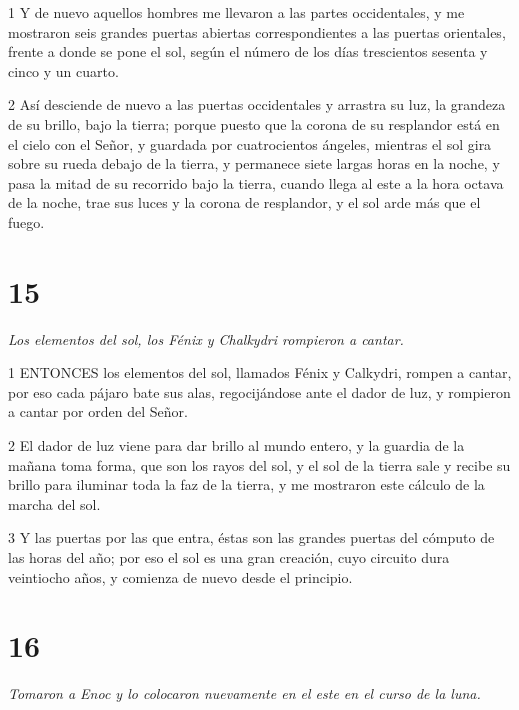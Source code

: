 \par 1 Y de nuevo aquellos hombres me llevaron a las partes occidentales, y me mostraron seis grandes puertas abiertas correspondientes a las puertas orientales, frente a donde se pone el sol, según el número de los días trescientos sesenta y cinco y un cuarto.

\par 2 Así desciende de nuevo a las puertas occidentales y arrastra su luz, la grandeza de su brillo, bajo la tierra; porque puesto que la corona de su resplandor está en el cielo con el Señor, y guardada por cuatrocientos ángeles, mientras el sol gira sobre su rueda debajo de la tierra, y permanece siete largas horas en la noche, y pasa la mitad de su recorrido bajo la tierra, cuando llega al este a la hora octava de la noche, trae sus luces y la corona de resplandor, y el sol arde más que el fuego.

\chapter{15}

\par \textit{Los elementos del sol, los Fénix y Chalkydri rompieron a cantar.}

\par 1 ENTONCES los elementos del sol, llamados Fénix y Calkydri, rompen a cantar, por eso cada pájaro bate sus alas, regocijándose ante el dador de luz, y rompieron a cantar por orden del Señor.

\par 2 El dador de luz viene para dar brillo al mundo entero, y la guardia de la mañana toma forma, que son los rayos del sol, y el sol de la tierra sale y recibe su brillo para iluminar toda la faz de la tierra, y me mostraron este cálculo de la marcha del sol.

\par 3 Y las puertas por las que entra, éstas son las grandes puertas del cómputo de las horas del año; por eso el sol es una gran creación, cuyo circuito dura veintiocho años, y comienza de nuevo desde el principio.

\chapter{16}

\par \textit{Tomaron a Enoc y lo colocaron nuevamente en el este en el curso de la luna.}

